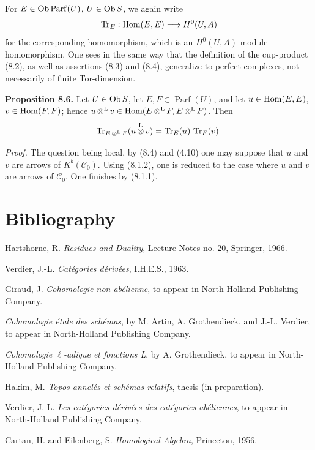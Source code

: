 \documentclass[11pt]{article}
\newcommand{\Parf}{\operatorname{Parf}}
\begin{document}
For \(E\in\Ob\Parf(U)\), \(U\in\operatorname{Ob} S\), we again write
\[
  \operatorname{Tr}_E:\operatorname{Hom}(E,E)\longrightarrow H^0(U,A)
\]
for the corresponding homomorphism, which is an \(H^0(U,A)\)-module homomorphism. One sees in the same way that the definition of the cup-product (8.2), as well as assertions (8.3) and (8.4), generalize to perfect complexes, not necessarily of finite Tor-dimension.

\textbf{Proposition 8.6.} Let \(U\in\operatorname{Ob} S\), let \(E,F\in\Parf(U)\), and let \(u\in\operatorname{Hom}(E,E)\), \(v\in\operatorname{Hom}(F,F)\); hence \(u\mathop{\otimes}^{\mathrm L} v\in\operatorname{Hom}(E\mathop{\otimes}^{\mathrm L} F,E\mathop{\otimes}^{\mathrm L} F)\). Then
\[
  \operatorname{Tr}_{E\mathop{\otimes}^{\mathrm L} F}(u\mathop{\otimes}^{\mathrm L} v)=\operatorname{Tr}_E(u)\,\operatorname{Tr}_F(v).
\]

\emph{Proof.} The question being local, by (8.4) and (4.10) one may suppose that \(u\) and \(v\) are arrows of \(K^b(\mathcal C_0)\). Using (8.1.2), one is reduced to the case where \(u\) and \(v\) are arrows of \(\mathcal C_0\). One finishes by (8.1.1).

\section*{Bibliography}
\begin{description}[leftmargin=2.5cm,style=nextline]
\item[{[H]}] Hartshorne, R. \emph{Residues and Duality}, Lecture Notes no. 20, Springer, 1966.
\item[{[V]}] Verdier, J.-L. \emph{Catégories dérivées}, I.H.E.S., 1963.
\item[{[G]}] Giraud, J. \emph{Cohomologie non abélienne}, to appear in North-Holland Publishing Company.
\item[{SGA 4}] \emph{Cohomologie étale des schémas}, by M. Artin, A. Grothendieck, and J.-L. Verdier, to appear in North-Holland Publishing Company.
\item[{SGA 5}] \emph{Cohomologie \(\ell\)-adique et fonctions L}, by A. Grothendieck, to appear in North-Holland Publishing Company.
\item[{[1]}] Hakim, M. \emph{Topos annelés et schémas relatifs}, thesis (in preparation).
\item[{[2]}] Verdier, J.-L. \emph{Les catégories dérivées des catégories abéliennes}, to appear in North-Holland Publishing Company.
\item[{[MUL]}] Cartan, H. and Eilenberg, S. \emph{Homological Algebra}, Princeton, 1956.
\end{description}
\end{document}
